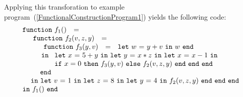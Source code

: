Applying this transforation to example
program~(\ref{FunctionalConstructionProgram1}) yields the following
code:
\begin{equation}
\label{FunctionalConstructionProgram3}
\begin{array}{l}
  \begin{array}{lcl}\mathtt{function}\ f_1() & = & \end{array}\\
  \quad
   \begin{array}[t]{l} 
     \begin{array}{lcl}\mathtt{function}\ f_2(v,z,y) & = & \end{array}\\
     \quad \begin{array}{l}  
             \begin{array}{lcl}\mathtt{function}\ f_3(y,v) & = & \letin w {y+v} w\end{array}\\
             \, \mathtt{in}\
              \begin{array}[t]{l}
                \letinD x {5+y} {
                  \letinD y {x*z} {
                   \letinD x {x-1} {}}}\\ 
                  \ite {x=0} {\call {f_3} {y,v}}
                     {\call {f_2} {v,z,y}}\ \mathtt{end}\ \mathtt{end}\ \mathtt{end}
              \end{array}\\
             \mathtt{end}
           \end{array}\\
     \, \mathtt{in}\ \letin v 1 {
              \letin z 8 {
                 \letin y 4 {\call {f_2} {v,z,y}}
              }
            }
   \end{array}\\
\begin{array}{lcl}
  \mathtt{in}\ f_1()\ \mathtt{end}
\end{array} 
\end{array}
\end{equation}


